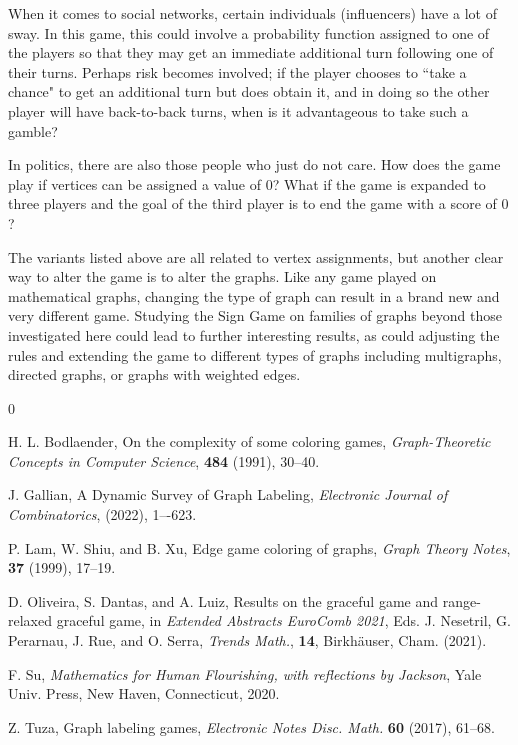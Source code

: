\documentclass[amsart,11pt]{article}
\theoremstyle{dotless}
\theoremstyle{dotless}
\begin{document}
When it comes to social networks, certain individuals (influencers) have a lot of sway. In this game, this could involve a probability function assigned to one of the players so that they may get an immediate additional turn following one of their turns. Perhaps risk becomes involved; if the player chooses to ``take a chance" to get an additional turn but does obtain it, and in doing so the other player will have back-to-back turns, when is it advantageous to take such a gamble?

In politics, there are also those people who just do not care. How does the game play if vertices can be assigned a value of $0$? What if the game is expanded to three players and the goal of the third player is to end the game with a score of $0$?

The variants listed above are all related to vertex assignments, but another clear way to alter the game is to alter the graphs. Like any game played on mathematical graphs, changing the type of graph can result in a brand new and very different game. Studying the Sign Game on families of graphs beyond those investigated here could lead to further interesting results, as could adjusting the rules and extending the game to different types of graphs including multigraphs, directed graphs, or graphs with weighted edges.

\begin{thebibliography}{0}



 H. L. Bodlaender, On the complexity of some coloring games, \textit{Graph-Theoretic Concepts in Computer Science}, \textbf{484} (1991), 30--40.

 J. Gallian, A Dynamic Survey of Graph Labeling, \textit{Electronic Journal of Combinatorics}, (2022), 1–-623.

 P. Lam, W. Shiu, and B. Xu, Edge game coloring of graphs, \textit{Graph Theory Notes}, \textbf{37} (1999), 17--19.

 D. Oliveira, S. Dantas, and A. Luiz, Results on the graceful game and range-relaxed graceful game, in \textit{Extended Abstracts EuroComb 2021}, Eds. J. Nesetril, G. Perarnau, J. Rue, and O. Serra, \textit{Trends Math.}, \textbf{14}, Birkh\"auser, Cham. (2021). 

 F. Su, \textit{Mathematics for Human Flourishing, with reflections by Jackson}, Yale Univ. Press, New Haven, Connecticut, 2020.

 Z. Tuza, Graph labeling games, \textit{Electronic Notes Disc. Math.} \textbf{60} (2017), 61--68.

\end{thebibliography}
\end{document}
